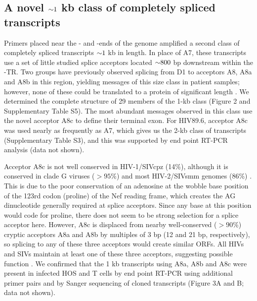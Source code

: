 \documentclass[../sherrill-Mix_thesis.tex]{subfiles}
\begin{document}
\subsection{A novel $\mathord{\sim}{}1$ kb class of completely spliced transcripts}
Primers placed near the \fivePrime{}- and \threePrime{}-ends of the \hivEight{} genome amplified a second class of completely spliced transcripts $\mathord{\sim}{}1$ kb in length. In place of A7, these transcripts use a set of little studied splice acceptors located $\mathord{\sim}{}800$ bp downstream within the \threePrime{}-TR. Two groups have previously observed splicing from D1 to acceptors A8, A8a and A8b in this region, yielding messages of this size class in patient samples; however, none of these could be translated to a protein of significant length \citep{Carrera2010,Smith1992}. We determined the complete structure of 29 members of the 1-kb class (Figure 2 and Supplementary Table S5). The most abundant messages observed in this class use the novel acceptor A8c to define their terminal exon. For HIV89.6, acceptor A8c was used nearly as frequently as A7, which gives us the 2-kb class of transcripts (Supplementary Table S3), and this was supported by end point RT-PCR analysis (data not shown).

Acceptor A8c is not well conserved in HIV-1/SIVcpz (14\%), although it is conserved in clade G viruses ($>95$\%) and most HIV-2/SIVsmm genomes (86\%) \citep{Kuiken2010}. This is due to the poor conservation of an adenosine at the wobble base position of the 123rd codon (proline) of the Nef reading frame, which creates the AG dinucleotide generally required at splice acceptors. Since any base at this position would code for proline, there does not seem to be strong selection for a splice acceptor here. However, A8c is displaced from nearby well-conserved ($>90$\%) cryptic acceptors A8a and A8b by multiples of 3 bp (12 and 21 bp, respectively), so splicing to any of these three acceptors would create similar ORFs. All HIVs and SIVs maintain at least one of these three acceptors, suggesting possible function \citep{Kuiken2010}. We confirmed that the 1 kb transcripts using A8a, A8b and A8c were present in infected HOS and T cells by end point RT-PCR using additional primer pairs and by Sanger sequencing of cloned transcripts (Figure 3A and B; data not shown). 
\end{document}
